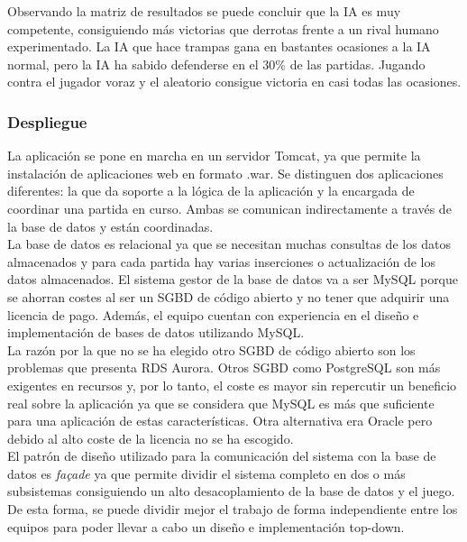 Observando la matriz de resultados se puede concluir que la IA es muy competente, consiguiendo más victorias que derrotas frente a un rival humano experimentado. La IA que hace trampas gana en bastantes ocasiones a la IA normal, pero la IA ha sabido defenderse en el 30\% de las partidas. Jugando contra el jugador voraz y el aleatorio consigue victoria en casi todas las ocasiones.

\subsubsection{Despliegue}
La aplicación se pone en marcha en un servidor Tomcat, ya que permite la instalación de aplicaciones web en formato .war. Se distinguen dos aplicaciones diferentes: la que da soporte a la lógica de la aplicación y la encargada de coordinar una partida en curso. Ambas se comunican indirectamente a través de la base de datos y están coordinadas. \\
La base de datos es relacional ya que se necesitan muchas consultas de los datos almacenados y para cada partida hay varias inserciones o actualización de los datos almacenados. El sistema gestor de la base de datos va a ser MySQL porque se ahorran costes al ser un SGBD de código abierto y no tener que adquirir una licencia de pago. Además, el equipo cuentan con experiencia en el diseño e implementación de bases de datos utilizando MySQL. \\
La razón por la que no se ha elegido otro SGBD de código abierto son los problemas que presenta RDS Aurora. Otros SGBD como PostgreSQL son más exigentes en recursos y, por lo tanto, el coste es mayor sin repercutir un beneficio real sobre la aplicación ya que se considera que MySQL es más que suficiente para una aplicación de estas características.
Otra alternativa era Oracle pero debido al alto coste de la licencia no se ha escogido. \\
El patrón de diseño utilizado para la comunicación del sistema con la base de datos es \textit{façade} ya que permite dividir el sistema completo en dos o más subsistemas consiguiendo un alto desacoplamiento de la base de datos y el juego. De esta forma, se puede dividir mejor el trabajo de forma independiente entre los equipos para poder llevar a cabo un diseño e implementación top-down.


